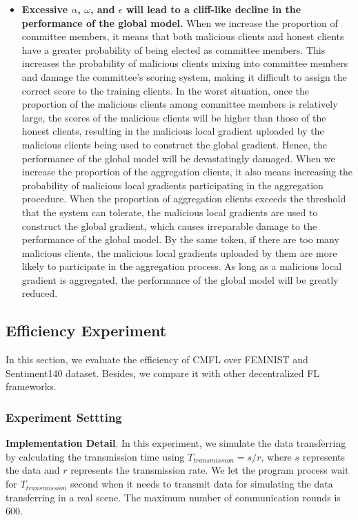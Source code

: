 \documentclass[10pt,journal,compsoc]{IEEEtran}
\begin{document}
\begin{itemize}
\item \textbf{Excessive $\alpha$, $\omega$, and $\epsilon$ will lead to a cliff-like decline in the performance of the global model.} When we increase the proportion of committee members, it means that both malicious clients and honest clients have a greater probability of being elected as committee members. This increases the probability of malicious clients mixing into committee members and damage the committee’s scoring system, making it difficult to assign the correct score to the training clients. In the worst situation, once the proportion of the malicious clients among committee members is relatively large, the scores of the malicious clients will be higher than those of the honest clients, resulting in the malicious local gradient uploaded by the malicious clients being used to construct the global gradient. Hence, the performance of the global model will be devastatingly damaged. When we increase the proportion of the aggregation clients, it also means increasing the probability of malicious local gradients participating in the aggregation procedure. When the proportion of aggregation clients exceeds the threshold that the system can tolerate, the malicious local gradients are used to construct the global gradient, which causes irreparable damage to the performance of the global model. By the same token, if there are too many malicious clients, the malicious local gradients uploaded by them are more likely to participate in the aggregation process. As long as a malicious local gradient is aggregated, the performance of the global model will be greatly reduced.
\end{itemize}


\subsection{Efficiency Experiment}
  
In this section, we evaluate the efficiency of CMFL over FEMNIST and Sentiment140 dataset. Besides, we compare it with other decentralized FL frameworks. 

\subsubsection{Experiment Settting}

\textbf{Implementation Detail}. In this experiment, we simulate the data transferring by calculating the transmission time using $T_{transmission} = s/r$, where $s$ represents the data and $r$ represents the transmission rate. We let the program process wait for $T_{transmission}$ second when it needs to transmit data for simulating the data transferring in a real scene. The maximum number of communication rounds is 600. 
\end{document}
